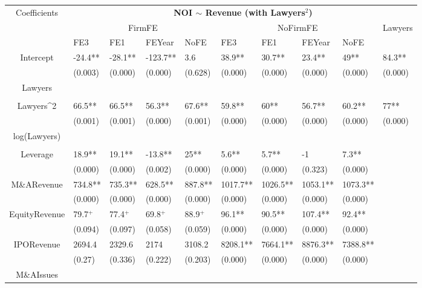 \documentclass{article}
\begin{document}
\begin{table}[H]
\centering
\begin{tabular}{|clllllllll|}
\hline
\multirow{3}{*}{Coefficients} & \multicolumn{9}{c|}{\textbf{NOI $\sim$ Revenue (with Lawyers$^2$)}} \\
\cline{2-10}
& \multicolumn{4}{c}{FirmFE} & \multicolumn{4}{c}{NoFirmFE} & \multirow{2}{*}{Lawyers} \\
\cline{2-9}
& FE3 & FE1 & FEYear & NoFE & FE3 & FE1 & FEYear & NoFE &  \\
\hline
 
Intercept & -24.4** & -28.1** & -123.7** & 3.6 & 38.9** & 30.7** & 23.4** & 49** & 84.3** \\ 
   & (0.003) & (0.000) & (0.000) & (0.628) & (0.000) & (0.000) & (0.000) & (0.000) & (0.000) \\ 
  Lawyers &  &  &  &  &  &  &  &  &  \\ 
   &  &  &  &  &  &  &  &  &  \\ 
  Lawyers^2 & 66.5** & 66.5** & 56.3** & 67.6** & 59.8** & 60** & 56.7** & 60.2** & 77** \\ 
   & (0.001) & (0.001) & (0.000) & (0.001) & (0.000) & (0.000) & (0.000) & (0.000) & (0.000) \\ 
  log(Lawyers) &  &  &  &  &  &  &  &  &  \\ 
   &  &  &  &  &  &  &  &  &  \\ 
  Leverage & 18.9** & 19.1** & -13.8** & 25** & 5.6** & 5.7** & -1 & 7.3** &  \\ 
   & (0.000) & (0.000) & (0.002) & (0.000) & (0.000) & (0.000) & (0.323) & (0.000) &  \\ 
  M\&ARevenue & 734.8** & 735.3** & 628.5** & 887.8** & 1017.7** & 1026.5** & 1053.1** & 1073.3** &  \\ 
   & (0.000) & (0.000) & (0.000) & (0.000) & (0.000) & (0.000) & (0.000) & (0.000) &  \\ 
  EquityRevenue & 79.7$^{+}$ & 77.4$^{+}$ & 69.8$^{+}$ & 88.9$^{+}$ & 96.1** & 90.5** & 107.4** & 92.4** &  \\ 
   & (0.094) & (0.097) & (0.058) & (0.059) & (0.000) & (0.000) & (0.000) & (0.000) &  \\ 
  IPORevenue & 2694.4 & 2329.6 & 2174 & 3108.2 & 8208.1** & 7664.1** & 8876.3** & 7388.8** &  \\ 
   & (0.27) & (0.336) & (0.222) & (0.203) & (0.000) & (0.000) & (0.000) & (0.000) &  \\ 
  M\&AIssues &  &  &  &  &  &  &  &  &  \\ 

\end{tabular}
\end{table}
\end{document}
